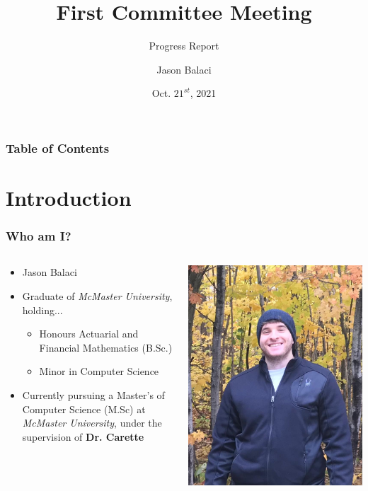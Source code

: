 \documentclass{beamer}
\title[Committee Meeting 1]{First Committee Meeting}
\subtitle{Progress Report}
\author{Jason Balaci}
\institute{McMaster University}
\date{Oct. $21^{st}$, 2021}
\begin{document}
\frame{\titlepage}

\begin{frame}
\frametitle{Table of Contents}
\tableofcontents
\end{frame}

\section{Introduction}
\begin{frame}
    \frametitle{Who am I?}
    \begin{columns}[T,onlytextwidth]
        \begin{column}{.5\textwidth}
            \begin{minipage}{\textwidth}
                \begin{itemize}
                    \item<1-> Jason Balaci
                    \item<2-> Graduate of \emph{McMaster University}, holding...
                        \begin{itemize}
                            \item<2-> Honours Actuarial and Financial Mathematics (B.Sc.)
                            \item<2-> Minor in Computer Science
                        \end{itemize}
                    \item<3-> Currently pursuing a Master's of Computer Science (M.Sc) at \emph{McMaster University}, under the supervision of \textbf{Dr. Carette}
                \end{itemize}
            \end{minipage}
        \end{column}
        \begin{column}{.45\textwidth}
            \includegraphics[width=.8\textwidth]{me.jpeg}
        \end{column}
    \end{columns}
\end{frame}
\end{document}
